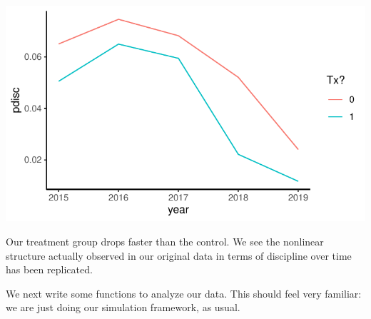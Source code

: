 \documentclass[
]{book}
\begin{document}
\begin{center}\includegraphics[width=0.75\linewidth]{Designing-Simulations-in-R_files/figure-latex/unnamed-chunk-255-1} \end{center}

Our treatment group drops faster than the control. We see the nonlinear structure actually observed in our original data in terms of discipline over time has been replicated.

We next write some functions to analyze our data.
This should feel very familiar: we are just doing our simulation framework, as usual.
\end{document}
